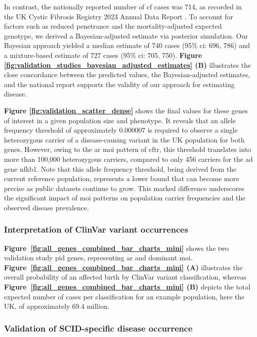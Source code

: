 In contrast, the nationally reported number of \ac{cf} cases was 714, as recorded in the UK Cystic Fibrosis Registry 2023 Annual Data Report
\cite{naito2023uk}. To account for factors such as reduced penetrance and the mortality-adjusted expected genotype, we derived a Bayesian-adjusted estimate via posterior simulation. Our Bayesian approach yielded a median estimate of 740 cases (95\% \ac{ci}: 696, 786) and a mixture-based estimate of 727 cases (95\% \ac{ci}: 705, 750).
\textbf{Figure \ref{fig:validation_studies_bayesian_adjusted_estimates} (B)} illustrates the close concordance between the predicted values, the Bayesian-adjusted estimates, and the national report supports the validity of our approach for estimating disease.


\textbf{Figure \ref{fig:validation_scatter_dense}} shows the final values for these genes of interest in a given population size and phenotype. It reveals that an allele frequency threshold of approximately 0.000007 is required to observe a single heterozygous carrier of a disease-causing variant in the UK population for both genes. However, owing to the \ac{ar} \ac{moi} pattern of \ac{cftr}, this threshold translates into more than 100,000 heterozygous carriers, compared to only 456 carriers for the \ac{ad} gene \ac{nfkb1}. Note that this allele frequency threshold, being derived from the current reference population, represents a lower bound that can become more precise as public datasets continue to grow. This marked difference underscores the significant impact of \ac{moi} patterns on population carrier frequencies and the observed disease prevalence.

\FloatBarrier
\subsubsection{Interpretation of ClinVar variant occurrences}

\textbf{Figure~\ref{fig:all_genes_combined_bar_charts_mini}} shows  the two validation study \ac{pid} genes, representing \ac{ar} and dominant \ac{moi}. \textbf{Figure~\ref{fig:all_genes_combined_bar_charts_mini} (A)}   illustrates the overall probability of an affected birth by ClinVar variant classification, whereas \textbf{Figure~\ref{fig:all_genes_combined_bar_charts_mini}  (B)}  depicts the total expected number of cases per classification for an example population, here the UK, of approximately 69.4 million. 

\subsubsection{Validation of SCID-specific disease occurrence}

